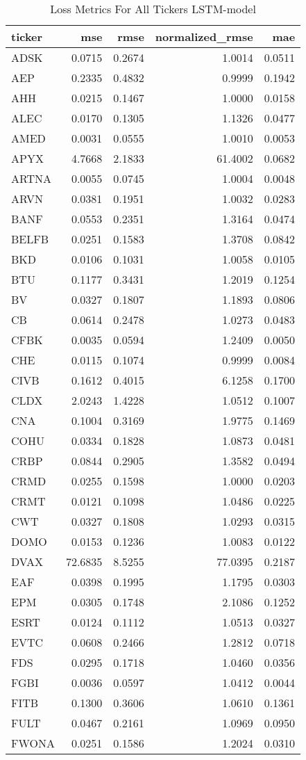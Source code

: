\begin{table}
\caption{Loss Metrics For All Tickers LSTM-model}
\label{tab:loss_total_lstm}
\begin{tabular}{lrrrr}
\toprule
ticker & mse & rmse & normalized_rmse & mae \\
\midrule
ADSK & 0.0715 & 0.2674 & 1.0014 & 0.0511 \\
AEP & 0.2335 & 0.4832 & 0.9999 & 0.1942 \\
AHH & 0.0215 & 0.1467 & 1.0000 & 0.0158 \\
ALEC & 0.0170 & 0.1305 & 1.1326 & 0.0477 \\
AMED & 0.0031 & 0.0555 & 1.0010 & 0.0053 \\
APYX & 4.7668 & 2.1833 & 61.4002 & 0.0682 \\
ARTNA & 0.0055 & 0.0745 & 1.0004 & 0.0048 \\
ARVN & 0.0381 & 0.1951 & 1.0032 & 0.0283 \\
BANF & 0.0553 & 0.2351 & 1.3164 & 0.0474 \\
BELFB & 0.0251 & 0.1583 & 1.3708 & 0.0842 \\
BKD & 0.0106 & 0.1031 & 1.0058 & 0.0105 \\
BTU & 0.1177 & 0.3431 & 1.2019 & 0.1254 \\
BV & 0.0327 & 0.1807 & 1.1893 & 0.0806 \\
CB & 0.0614 & 0.2478 & 1.0273 & 0.0483 \\
CFBK & 0.0035 & 0.0594 & 1.2409 & 0.0050 \\
CHE & 0.0115 & 0.1074 & 0.9999 & 0.0084 \\
CIVB & 0.1612 & 0.4015 & 6.1258 & 0.1700 \\
CLDX & 2.0243 & 1.4228 & 1.0512 & 0.1007 \\
CNA & 0.1004 & 0.3169 & 1.9775 & 0.1469 \\
COHU & 0.0334 & 0.1828 & 1.0873 & 0.0481 \\
CRBP & 0.0844 & 0.2905 & 1.3582 & 0.0494 \\
CRMD & 0.0255 & 0.1598 & 1.0000 & 0.0203 \\
CRMT & 0.0121 & 0.1098 & 1.0486 & 0.0225 \\
CWT & 0.0327 & 0.1808 & 1.0293 & 0.0315 \\
DOMO & 0.0153 & 0.1236 & 1.0083 & 0.0122 \\
DVAX & 72.6835 & 8.5255 & 77.0395 & 0.2187 \\
EAF & 0.0398 & 0.1995 & 1.1795 & 0.0303 \\
EPM & 0.0305 & 0.1748 & 2.1086 & 0.1252 \\
ESRT & 0.0124 & 0.1112 & 1.0513 & 0.0327 \\
EVTC & 0.0608 & 0.2466 & 1.2812 & 0.0718 \\
FDS & 0.0295 & 0.1718 & 1.0460 & 0.0356 \\
FGBI & 0.0036 & 0.0597 & 1.0412 & 0.0044 \\
FITB & 0.1300 & 0.3606 & 1.0610 & 0.1361 \\
FULT & 0.0467 & 0.2161 & 1.0969 & 0.0950 \\
FWONA & 0.0251 & 0.1586 & 1.2024 & 0.0310 \\
\bottomrule
\end{tabular}
\end{table}
